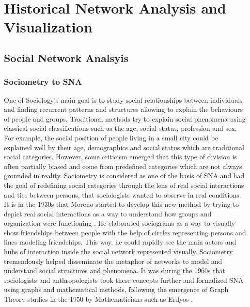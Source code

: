 
\chapter{Historical Network Analysis and Visualization}



\section{Social Network Analsyis}


\subsection{Sociometry to SNA}

One of Sociology's main goal is to study social relationships between individuals and finding recurrent patterns and structures allowing to explain the behaviours of people and groups.
Traditional methods try to explain social phenomena using classical social classifications such as the age, social status, profession and sex.
For example, the social position of people living in a small city could be explained well by their age, demographics and social status which are traditional social categories.
However, some criticism emerged that this type of division is often partially biased and come from predefined categories which are not always grounded in reality.
Sociometry is considered as one of the basis of SNA and had the goal of redefining social categories through the lens of real social interactions and ties between persons, that sociologists wanted to observe in real conditions.
It is in the 1930s that Moreno started to develop this new method by trying to depict real social interactions as a way to understand how groups and organization were functioning \cite{morenoFoundationsSociometryIntroduction1941}.
He elaborated sociograms as a way to visually show friendships between people with the help of circles representing persons and lines modeling friendships.
This way, he could rapidly see the main actors and hubs of interaction inside the social network represented visually.
Sociometry tremendously helped disseminate the metaphor of networks to model and understand social structures and phenomena.
It was during the 1960s that sociologists and anthropologists took these concepts further and formalized SNA using graphs and mathematical methods, following the emergence of Graph Theory studies in the 1950 by Mathematicians such as Erdyos .
